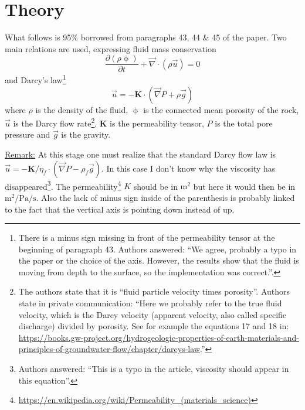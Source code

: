 \section*{Theory}

What follows is 95\% borrowed from paragraphs 43, 44 \& 45 of the paper.
Two main relations are used, expressing fluid mass conservation
\begin{equation}
\frac{\partial (\rho \upphi)}{\partial t} + \vec\nabla\cdot (\rho \vec{u}) = 0
\label{eq:por01}
\end{equation}
and Darcy's law\footnote{There is a minus sign missing in front of the permeability tensor at the 
beginning of paragraph 43. Authors answered: ``We agree, probably a typo in the paper 
or the choice of the axis. However, the results show that the fluid is moving from 
depth to the surface, so the implementation was correct.''.}
\begin{equation}
\vec{u} = - {\bm K} \cdot (\vec{\nabla} P + \rho \vec{g})
\label{eq:por00}
\end{equation}
where $\rho$ is the density of the fluid, $\upphi$ is the
connected mean porosity of the rock, $\vec{u}$ is the Darcy flow
rate\footnote{The authors state that it is ``fluid particle velocity times porosity''. 
Authors state in private communication: ``Here we probably refer to the true fluid velocity, 
which is the Darcy velocity (apparent velocity, also called specific discharge) divided 
by porosity. See for example the equations 17 and 18 in: 
\url{https://books.gw-project.org/hydrogeologic-properties-of-earth-materials-and-principles-of-groundwater-flow/chapter/darcys-law}.'' }, ${\bm K}$ is the permeability tensor, $P$ is the total pore pressure and $\vec{g}$ is
the gravity. 

\underline{Remark:} 
At this stage one must realize that the standard Darcy flow law is 
$\vec{u} = - {\bm K}/\eta_f \cdot (\vec{\nabla} P - \rho_f \vec{g})$. 
In this case I don't know why the viscosity has disappeared\footnote{
Authors answered: ``This is a typo in the article, viscosity should appear in this equation''.}. 
The permeability\footnote{\url{https://en.wikipedia.org/wiki/Permeability_(materials_science)}} 
$K$ should be in $\si{\square\meter}$ but here it would then be in $\si{\square\meter\per\pascal\per\second}$. 
Also the lack of minus sign inside of the parenthesis 
is probably linked to the fact that the vertical axis is pointing down instead of up. 

